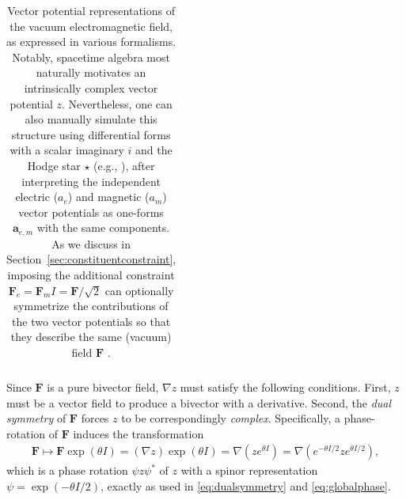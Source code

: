 \documentclass[1p,sort&compress]{elsarticle}
\numberwithin{equation}{section}
\newcommand{\bv}[1]{\mathbf{#1}}
\begin{document}
\begin{table}
\begin{tabular}{l l}
    \hline 
 \end{tabular}
 \caption[Vector potentials]{Vector potential representations of the vacuum electromagnetic field, as expressed in various formalisms.  Notably, spacetime algebra most naturally motivates an intrinsically complex vector potential $z$.  Nevertheless, one can also manually simulate this structure using differential forms with a scalar imaginary $i$ and the Hodge star $\star$ (e.g., \cite{Bliokh2013,Vasconcellos2014}), after interpreting the independent electric ($a_e$) and magnetic ($a_m$) vector potentials as one-forms $\bv{a}_{e,m}$ with the same components.  As we discuss in Section~\ref{sec:constituentconstraint}, imposing the additional constraint $\bv{F}_e = \bv{F}_m I = \bv{F}/\sqrt{2}$ can optionally symmetrize the contributions of the two vector potentials so that they describe the same (vacuum) field $\bv{F}$ \cite{Bliokh2013,Vasconcellos2014}.}
 \label{tab:potentials}
\end{table}

Since $\bv{F}$ is a pure bivector field, $\nabla z$ must satisfy the following conditions.  First, $z$ must be a vector field to produce a bivector with a derivative.  Second,  
the \emph{dual symmetry} of $\bv{F}$ forces $z$ to be correspondingly \emph{complex}.  Specifically, a phase-rotation of $\bv{F}$ induces the transformation 
\begin{align}
  \bv{F} \mapsto \bv{F}\exp(\theta I) = (\nabla z)\exp(\theta I) = \nabla (ze^{\theta I}) = \nabla (e^{-\theta I/2}ze^{\theta I/2}),
\end{align}
which is a phase rotation $\psi z \psi^*$ of $z$ with a spinor representation $\psi = \exp(-\theta I /2)$, exactly as used in \eqref{eq:dualsymmetry} and \eqref{eq:globalphase}.
\end{document}
